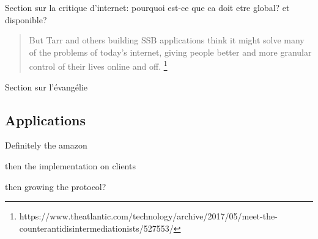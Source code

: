 \documentclass{article}
\begin{document}
Section sur la critique d'internet: pourquoi est-ce que ca doit etre global? et disponible?

\begin{quote}
    But Tarr and others building SSB applications think it might solve many of the problems of today’s internet, giving people better and more granular control of their lives online and off. \footnote{https://www.theatlantic.com/technology/archive/2017/05/meet-the-counterantidisintermediationists/527553/}
\end{quote}

Section sur l'évangélie

\subsection{Applications}

Definitely the amazon

then the implementation on clients

then growing the protocol?

\pagebreak



\end{document}

